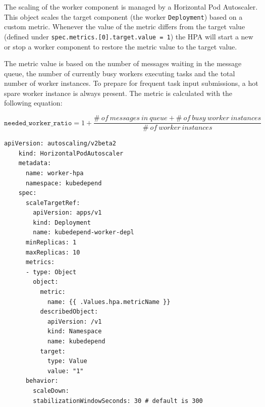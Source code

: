 The scaling of the worker component is managed by a Horizontal Pod Autoscaler. This object scales the target component (the worker \texttt{Deployment}) based on a custom metric. Whenever the value of the metric differs from the target value (defined under \texttt{spec.metrics.[0].target.value = 1}) the HPA will start a new or stop a worker component to restore the metric value to the target value.

The metric value is based on the number of messages waiting in the message queue, the number of currently busy workers executing tasks and the total number of worker instances. To prepare for frequent task input submissions, a hot spare worker instance is always present. The metric is calculated with the following equation:

\[
	\texttt{needed\_worker\_ratio} = 1 + \frac{\#\ of\ messages\ in\ queue + \#\ of\ busy\ worker\ instances}{\#\ of\ worker\ instances}
\]

\vspace{0.5cm}
\begin{minipage}{\linewidth}
	\begin{lstlisting}[caption={Worker \texttt{Horizontal Pod Autoscaler}}]
	apiVersion: autoscaling/v2beta2
	kind: HorizontalPodAutoscaler
	metadata:
	  name: worker-hpa
	  namespace: kubedepend
	spec:
	  scaleTargetRef:
	    apiVersion: apps/v1
	    kind: Deployment
	    name: kubedepend-worker-depl
	  minReplicas: 1
	  maxReplicas: 10
      metrics:
      - type: Object
	    object:
	      metric:
            name: {{ .Values.hpa.metricName }}
          describedObject:
            apiVersion: /v1
            kind: Namespace
            name: kubedepend
          target:
            type: Value
            value: "1"
      behavior:
        scaleDown:
        stabilizationWindowSeconds: 30 # default is 300
	\end{lstlisting}
\end{minipage}











